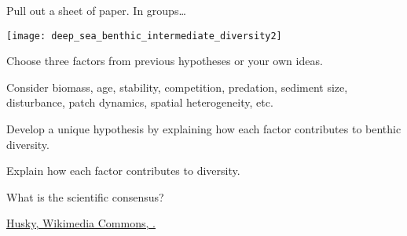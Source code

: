 \documentclass[t]{beamer}
\begin{document}
%


\begin{frame}[t]{Pull out a sheet of paper. In groups\dots}

	\vspace*{-\baselineskip}

	\begin{multicols}{2}

	\texttt{[image: deep\_sea\_benthic\_intermediate\_diversity2]}

	\columnbreak
	
	\hangpara Choose three factors from previous hypotheses or your own ideas.
	
	\hangpara Consider biomass, age, stability, competition, predation, sediment size, disturbance, patch dynamics, spatial heterogeneity, etc.

	\hangpara Develop a unique hypothesis by explaining how each factor contributes to benthic diversity. 
	
	\hangpara Explain how each factor contributes to diversity. 

	\end{multicols}

\end{frame}

%


\begin{frame}[t]{What is the scientific consensus?}

\hangpara{}

\vspace*{2\baselineskip}

\hangpara{}

\vspace*{2\baselineskip}

\hangpara{}

\end{frame}

%


{
\begin{frame}

\tinyfill \href{https://en.m.wikipedia.org/wiki/File:Upload_free_image_notext.svg}{Husky, Wikimedia Commons, .}

\end{frame}
}
\end{document}
